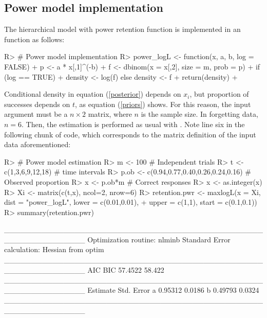 \documentclass[nojss]{jss}
\begin{document}
\subsection*{Power model implementation}

The hierarchical model with power retention function is implemented in an  function as follows:

\begin{Schunk}
\begin{Sinput}
R> # Power model implementation
R> power_logL <- function(x, a, b, log = FALSE){
+    p <- a * x[,1]^(-b)
+    f <- dbinom(x = x[,2], size = m, prob = p)
+    if (log == TRUE)
+      density <- log(f) else density <- f
+    return(density)
+  }
\end{Sinput}
\end{Schunk}

Conditional density in equation (\ref{posterior}) depends on $x_i$, but proportion of successes depends on $t$, as equation (\ref{priors}) shows. For this reason, the input argument  must be a $n\times 2$ matrix, where $n$ is the sample size. In forgetting data, $n=6$. Then, the estimation is performed as usual with . Note line six in the following chunk of code, which corresponds to the matrix definition of the input data aforementioned:

\begin{Schunk}
\begin{Sinput}
R> # Power model estimation
R> m <- 100 # Independent trials
R> t <- c(1,3,6,9,12,18) # time intervals
R> p.ob <- c(0.94,0.77,0.40,0.26,0.24,0.16) # Observed proportion
R> x <- p.ob*m # Correct responses
R> x <- as.integer(x)
R> Xi <- matrix(c(t,x), ncol=2, nrow=6)
R> retention.pwr <- maxlogL(x = Xi, dist = "power_logL", lower = c(0.01,0.01),
+                           upper = c(1,1), start = c(0.1,0.1))
R> summary(retention.pwr)
\end{Sinput}
\begin{Soutput}
_______________________________________________________________
Optimization routine: nlminb 
Standard Error calculation: Hessian from optim 
_______________________________________________________________
      AIC    BIC
  57.4522 58.422
_______________________________________________________________
  Estimate  Std. Error
a   0.95312     0.0186
b   0.49793     0.0324
_______________________________________________________________
\end{Soutput}
\end{Schunk}
\end{document}

